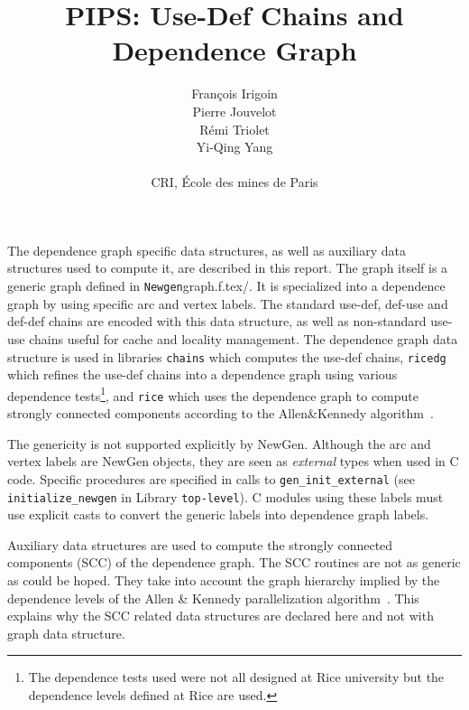 \documentclass[a4paper]{article}
\title{PIPS: Use-Def Chains and Dependence Graph}
\author{Fran\c{c}ois Irigoin \\
    Pierre Jouvelot \\
    R\'emi Triolet\\
    Yi-Qing Yang \\
\\
    CRI, \'Ecole des mines de Paris}
\begin{document}
\maketitle


The dependence graph specific data structures, as well as auxiliary data
structures used to compute it, are described in this report. The graph
itself is a generic graph defined in \verb/Newgen/graph.f.tex/. It is
specialized into a dependence graph by using specific arc and vertex
labels. The standard use-def, def-use and def-def chains are encoded with
this data structure, as well as non-standard use-use chains useful for
cache and locality management. The dependence graph data structure is used
in libraries \verb/chains/ which computes the use-def chains,
\verb/ricedg/ which refines the use-def chains into a dependence graph
using various dependence tests\footnote{The dependence tests used were not
  all designed at Rice university but the dependence levels defined at
  Rice are used.}, and \verb/rice/ which uses the dependence
graph to compute strongly connected components according to the
Allen\&Kennedy algorithm~\cite{AK87}.

The genericity is not supported explicitly by NewGen\cite{JT89,JT90}. Although the arc
and vertex labels are NewGen objects, they are seen as {\em external}
types when used in C code. Specific procedures are specified in calls to
\verb/gen_init_external/ (see \verb/initialize_newgen/ in Library
\verb/top-level/). C modules using these labels must use explicit
casts to convert the generic labels into dependence graph labels.

Auxiliary data structures are used to compute the strongly connected
components (SCC) of the dependence graph. The SCC routines are not as
generic as could be hoped. They take into account the graph hierarchy
implied by the dependence levels of the Allen \& Kennedy parallelization
algorithm~\cite{AK87}. This explains why the SCC related data structures are declared
here and not with graph data structure.

\begin{comment}
Les structures de donne'es suivantes sont utilise'es par la phase de
construction du graphe des de'pendances. Elles sont construites en
utilisant les structures de donne'es \verb+statement+ et \verb+effect+
qui ont e'te' de'finies dans la repre'sentation interne, ainsi que la
structure de donne'es ge'ne'riques \verb+vertex+ qui fait partie du
package graph 
\end{comment}
\end{document}
